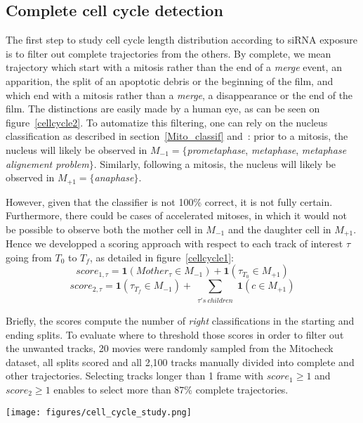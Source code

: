 \subsection{Complete cell cycle detection}
The first step to study cell cycle length distribution according to siRNA exposure is to filter out complete trajectories from the others. By complete, we mean trajectory which start with a mitosis rather than the end of a \textit{merge} event, an apparition, the split of an apoptotic debris or the beginning of the film, and which end with a mitosis rather than a \textit{merge}, a disappearance or the end of the film. The distinctions are easily made by a human eye, as can be seen on figure~\ref{cellcycle2}. To automatize this filtering, one can rely on the nucleus classification as described in section~\ref{Mito_classif} and~\cite{pmid20360735}: prior to a mitosis, the nucleus will likely be observed in $M_{-1}=\{$\textit{prometaphase}, \textit{metaphase}, \textit{metaphase alignement problem}$\}$. Similarly, following a mitosis, the nucleus will likely be observed in $M_{+1}=\{$\textit{anaphase}$\}$. 

However, given that the classifier is not 100\% correct, it is not fully certain. Furthermore, there could be cases of accelerated mitoses, in which it would not be possible to observe both the mother cell in $M_{-1}$ and the daughter cell in $M_{+1}$. Hence we developped a scoring approach with respect to each track of interest $\tau$ going from $T_0$ to $T_f$, as detailed in figure~\ref{cellcycle1}:
 \[score_{1, \tau} = \mathbf{1} (Mother_\tau \in M_{-1}) + \mathbf{1} (\tau_{T_0} \in M_{+1}) \]
 \[score_{2, \tau} = \mathbf{1} (\tau_{T_f} \in M_{-1}) + \sum_{\substack{\tau 's~ children}}\mathbf{1} (c \in M_{+1}) \]
 
Briefly, the scores compute the number of \textit{right} classifications in the starting and ending splits. To evaluate where to threshold those scores in order to filter out the unwanted tracks, 20 movies were randomly sampled from the Mitocheck dataset, all splits scored and all 2,100 tracks manually divided into complete and other trajectories. Selecting tracks longer than 1 frame with $score_1\geq 1$ and $score_2\geq 1$ enables to select more than 87\% complete trajectories.

\begin{figure*}[ht!]
\centerline{\texttt{[image: figures/cell\_cycle\_study.png]}}
\caption{Approach to cell cycle study}
\label{cellcycle1}
\end{figure*}


